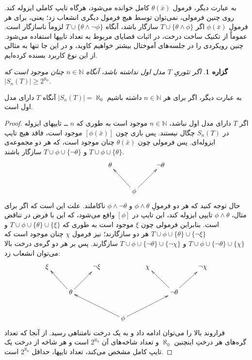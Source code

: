 \documentclass[12pt,a4paper]{report}
\theoremstyle{colorhead}
\newtheorem{prop}[thm]{گزاره}
\begin{document}
به عبارت دیگر، فرمول
$\theta(\bar{x})$
کامل خوانده می‌شود، هرگاه تایپ کاملی ایزوله کند. روی چنین فرمولی، نمی‌توان توسط هیچ فرمول دیگری انشعاب زد؛ یعنی، برای هر فرمولِ 
$\phi(\bar{x})$
اگر
$T\cup \{\theta\wedge \phi\}$
سازگار باشد، آنگاه 
$T\cup \{\theta\wedge\neg\phi\}$
لزوماً ناسازگار است. عموماً از تکنیک ساخت درخت، در اثبات قضایای مربوط به تعداد تایپها استفاده می‌شود. چنین رویکردی را در جلسه‌های آموختال بیشتر خواهیم کاوید، و در این جا تنها به مثالی از این نوع کاربرد بسنده کرده‌ایم. 
\begin{prop}
\label{deraxt1}
اگر تئوریِ
$T$
مدل اول نداشته باشد، آنگاه 
$n\in \mathbb{N}$
چنان موجود است که 
\mbox{$|S_n(T)|\geq 2^{\aleph_0}$}.
\end{prop}
به عبارت دیگر، اگر برای هر
$n\in \mathbb{N}$
داشته باشیم
$|S_n(T)|=\aleph_0$
آنگاه 
$T$
دارای مدل اول است.
\begin{proof}
اگر
$T$
دارای مدل اول نباشد،
$n\in \mathbb{N}$
موجود است به طوری که 
$n$ ــ
تایپهای ایزوله در
$S_n(T)$
چگال نیستند. پس بازی چون
$[\phi(\bar{x})]$
موجود است، فاقد هیچ تایپ ایزوله‌ای. پس فرمولی چون
$\theta(\bar{x})$
چنان موجود است،  که هر دو مجموعه‌ی
$T\cup \phi\cup \{\theta\}$
و
$T\cup\phi\cup \{\neg\theta\}$
سازگار باشند.
\[
\xymatrix{
& \theta & & \neg\theta\\
&& \phi \ar[ul]\ar[ur]
}
\]
حال توجه کنید که هر دو فرمولِ
$\phi\wedge\theta$
و 
$\phi\wedge\neg \theta$
ناکاملند. علت این است که اگر برای مثال،
$\phi\wedge \theta$
تایپی ایزوله کند، این تایپ در
$[\phi]$
واقع می‌شود، که این با فرض در تناقض است. بنابراین فرمولی چون
$\xi$
موجود است به طوری که 
$T\cup \phi\cup \{\theta\}\cup \{\xi\}$
و
$T\cup\phi\cup \{\theta\}\cup \{\neg \xi\}$
هر دو سازگارند؛‌ نیز فرمول
$\chi$
چنان موجود است که 
$T\cup\phi\cup \{\neg \theta\}\cup \{ \chi\}$
و
$T\cup\phi\cup \{\neg \theta\}\cup \{\neg \chi\}$
سازگارند. پس
 بر هر دو گره‌ی درخت بالا می‌توان انشعاب زد:
\[
\xymatrix{
\xi & & \neg \xi& & \chi & & \neg \chi\\
 & \theta\ar[ul]\ar[ur] & & & & \neg\theta\ar[ul]\ar[ur]& \\
 & & & \phi\ar[ull]\ar[urr]& & & \\
}
\]
فراروند بالا را می‌توان ادامه داد و به یک درخت نامتناهی رسید. از آنجا که تعداد گره‌های هر درختِ اینچنین
$\aleph_0$
و
تعداد شاخه‌های آن
$2^{\aleph_0}$
است و هر شاخه از درخت یک تایپ کامل مشخص می‌کند، تعداد تایپها، حداقل
$2^{\aleph_0}$
است.
\end{proof}
\pagebreak
\end{document}
